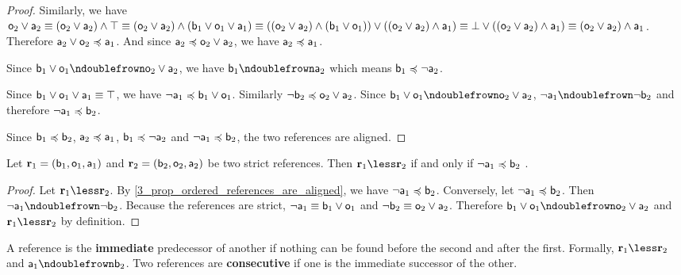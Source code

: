 \documentclass[11pt,letterpaper,fleqn]{memoir} %
\begin{document}
\begin{mathSection}
\begin{proof}
	Similarly, we have $\stmt[o]_2 \OR \stmt[a]_2 \equiv (\stmt[o]_2 \OR \stmt[a]_2) \AND \certainty \equiv (\stmt[o]_2 \OR \stmt[a]_2) \AND (\stmt[b]_1 \OR \stmt[o]_1 \OR \stmt[a]_1) \equiv ((\stmt[o]_2 \OR \stmt[a]_2) \AND (\stmt[b]_1 \OR \stmt[o]_1)) \OR ((\stmt[o]_2 \OR \stmt[a]_2) \AND \stmt[a]_1) \equiv \impossibility \OR ((\stmt[o]_2 \OR \stmt[a]_2) \AND \stmt[a]_1) \equiv (\stmt[o]_2 \OR \stmt[a]_2) \AND \stmt[a]_1$. Therefore $\stmt[a]_2 \OR \stmt[o]_2 \narrower \stmt[a]_1$. And since $\stmt[a]_2 \narrower \stmt[o]_2 \OR \stmt[a]_2$, we have $\stmt[a]_2 \narrower \stmt[a]_1$.
	
	Since $\stmt[b]_1 \OR \stmt[o]_1 \ncomp \stmt[o]_2 \OR \stmt[a]_2$, we have $\stmt[b]_1 \ncomp \stmt[a]_2$ which means $\stmt[b]_1 \narrower \NOT \stmt[a]_2$.
	
	Since $\stmt[b]_1 \OR \stmt[o]_1 \OR \stmt[a]_1 \equiv \certainty$, we have $\NOT \stmt[a]_1 \narrower \stmt[b]_1 \OR \stmt[o]_1$. Similarly $\NOT \stmt[b]_2 \narrower \stmt[o]_2 \OR \stmt[a]_2$. Since $\stmt[b]_1 \OR \stmt[o]_1 \ncomp \stmt[o]_2 \OR \stmt[a]_2$, $\NOT \stmt[a]_1 \ncomp \NOT \stmt[b]_2$ and therefore $\NOT \stmt[a]_1 \narrower \stmt[b]_2$.
	
	Since $\stmt[b]_1 \narrower \stmt[b]_2$, $\stmt[a]_2 \narrower \stmt[a]_1$, $\stmt[b]_1 \narrower \NOT \stmt[a]_2$ and $\NOT \stmt[a]_1 \narrower \stmt[b]_2$, the two references are aligned.
\end{proof}
\begin{prop}\label{3_prop_strict_references_ordering_condition}
	Let $\refStmt_1 = ( \stmt[b]_1, \stmt[o]_1, \stmt[a]_1 )$ and $\refStmt_2 = ( \stmt[b]_2, \stmt[o]_2, \stmt[a]_2 )$ be two strict references. Then $\refStmt_1 \less \refStmt_2$ if and only if $\NOT \stmt[a]_1 \narrower \stmt[b]_2$ .
\end{prop}
\begin{proof}
	Let $\refStmt_1 \less \refStmt_2$. By \ref{3_prop_ordered_references_are_aligned}, we have $\NOT \stmt[a]_1 \narrower \stmt[b]_2$. Conversely, let $\NOT \stmt[a]_1 \narrower \stmt[b]_2$. Then $\NOT \stmt[a]_1 \ncomp \NOT \stmt[b]_2$. Because the references are strict, $\NOT \stmt[a]_1 \equiv \stmt[b]_1 \OR \stmt[o]_1$ and $\NOT \stmt[b]_2 \equiv \stmt[o]_2 \OR \stmt[a]_2$. Therefore $\stmt[b]_1 \OR \stmt[o]_1 \ncomp \stmt[o]_2 \OR \stmt[a]_2$ and $\refStmt_1 \less \refStmt_2$ by definition.
\end{proof}

\begin{defn}
	A reference is the \textbf{immediate} predecessor of another if nothing can be found before the second and after the first. Formally, $\refStmt_1 \less \refStmt_2$ and $\stmt[a]_1 \ncomp \stmt[b]_2$. Two references are \textbf{consecutive} if one is the immediate successor of the other.
\end{defn}


\end{mathSection}
\end{document}
